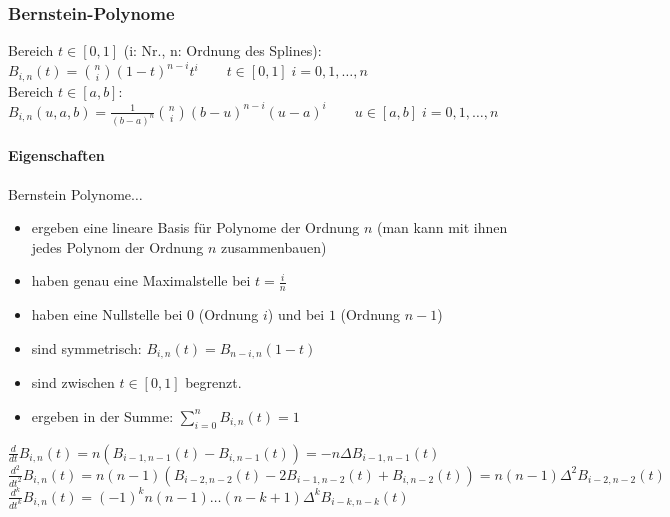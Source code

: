 \begin{minipage}[c]{15.0cm}	
	\subsubsection{Bernstein-Polynome}
	  	Bereich $t \in [0,1]$ (i: Nr., n: Ordnung des Splines):\\
	  	
	    $B_{i,n}(t) = \binom{n}{i}(1-t)^{n-i} t^i \qquad t \in [0,1]\; i=0,1,\ldots, n$\\
	    
	    Bereich $t \in [a,b]$:\\
	    
	    $B_{i,n}(u,a,b) =\frac{1}{(b-a)^n}\binom{n}{i}(b-u)^{n-i} (u-a)^i \qquad u \in [a,b]\; i=0,1,\ldots, n$
	\paragraph{Eigenschaften}
		Bernstein Polynome$\ldots$
	    \begin{itemize}
	      \item ergeben eine lineare Basis für Polynome der Ordnung $n$ (man kann mit ihnen jedes Polynom der Ordnung $n$ zusammenbauen)
	      \item haben genau eine Maximalstelle bei $t=\frac in$
	      \item haben eine Nullstelle bei $0$ (Ordnung $i$) und bei $1$ (Ordnung $n-1$)
	      \item sind symmetrisch: $B_{i,n}(t) = B_{n-i,n}(1-t)$
	      \item sind zwischen $t \in [0,1]$ begrenzt.
	      \item ergeben in der Summe: $\sum \limits_{i=0}^n B_{i,n}(t)=1$
	    \end{itemize}
	    
	    $\frac{d}{dt} B_{i,n}(t) = n(B_{i-1,n-1}(t) - B_{i,n-1}(t)) = -n \Delta B_{i-1,n-1}(t)$\\
	    $\frac{d^2}{dt^2} B_{i,n}(t) = n(n-1)(B_{i-2,n-2}(t) -2 B_{i-1,n-2}(t) + B_{i,n-2}(t)) = n(n-1) \Delta^2 B_{i-2,n-2}(t)$\\
	    $\frac{d^k}{dt^k} B_{i,n}(t) = (-1)^k n(n-1)\ldots(n-k+1) \Delta^k B_{i-k,n-k}(t)$
\end{minipage}
\hfill    
